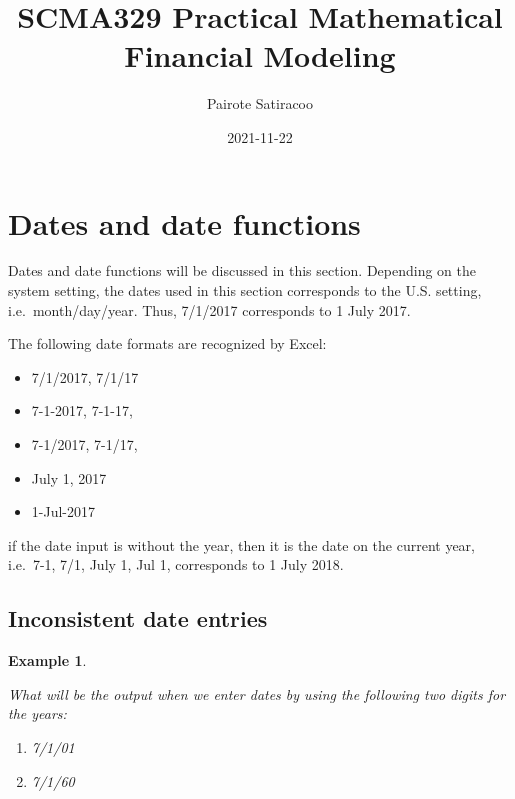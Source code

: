 \documentclass[
]{article}
\title{SCMA329 Practical Mathematical Financial Modeling}
\author{Pairote Satiracoo}
\date{2021-11-22}
\theoremstyle{definition}
\theoremstyle{definition}
\newtheorem{example}{Example}[section]
\theoremstyle{definition}
\theoremstyle{definition}
\theoremstyle{remark}
\begin{document}
\maketitle

{
\setcounter{tocdepth}{2}
\tableofcontents
}
\hypertarget{dates-and-date-functions}{%
\section{Dates and date functions}\label{dates-and-date-functions}}

Dates and date functions will be discussed in this section. Depending on
the system setting, the dates used in this section corresponds to the
U.S. setting, i.e.~month/day/year. Thus, 7/1/2017 corresponds to 1 July
2017.

The following date formats are recognized by Excel:

\begin{itemize}
\item
  7/1/2017, 7/1/17
\item
  7-1-2017, 7-1-17,
\item
  7-1/2017, 7-1/17,
\item
  July 1, 2017
\item
  1-Jul-2017
\end{itemize}

if the date input is without the year, then it is the date on the
current year, i.e.~7-1, 7/1, July 1, Jul 1, corresponds to 1 July 2018.

\hypertarget{inconsistent-date-entries}{%
\subsection{Inconsistent date entries}\label{inconsistent-date-entries}}

\begin{example}
\protect\hypertarget{exm:unlabeled-div-1}{}\label{exm:unlabeled-div-1}

\emph{What will be the output when we enter dates by using the
following two digits for the years:}

\begin{enumerate}
\def\labelenumi{\arabic{enumi}.}
\item
  \emph{7/1/01}
\item
  \emph{7/1/60}
\end{enumerate}

\end{example}
\end{document}
